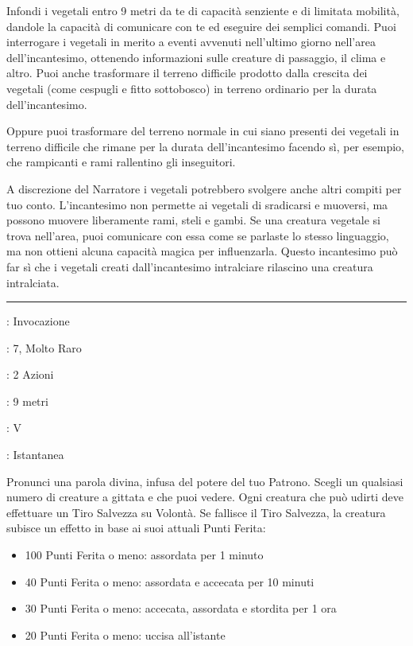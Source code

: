 \begin{multicols}{2}
Infondi i vegetali entro 9 metri da te di capacità senziente e di limitata mobilità, dandole la capacità di comunicare con te ed eseguire dei semplici comandi. Puoi interrogare i vegetali in merito a eventi avvenuti nell'ultimo giorno nell'area dell'incantesimo, ottenendo informazioni sulle creature di passaggio, il clima e altro. Puoi anche trasformare il terreno difficile prodotto dalla crescita dei vegetali (come cespugli e fitto sottobosco) in terreno ordinario per la durata dell'incantesimo.

Oppure puoi trasformare del terreno normale in cui siano presenti dei vegetali in terreno difficile che rimane per la durata dell'incantesimo facendo sì, per esempio, che rampicanti e rami rallentino gli inseguitori.

A discrezione del Narratore i vegetali potrebbero svolgere anche altri compiti per tuo conto. L'incantesimo non permette ai vegetali di sradicarsi e muoversi, ma possono muovere liberamente rami, steli e gambi. Se una creatura vegetale si trova nell'area, puoi comunicare con essa come se parlaste lo stesso linguaggio, ma non ottieni alcuna capacità magica per influenzarla. Questo incantesimo può far sì che i vegetali creati dall'incantesimo intralciare rilascino una creatura intralciata.

\smallskip\noindent\rule{\linewidth}{2pt} \hypertarget{Parola Divina}{}\smallskip{}
\noindent
\begin{description}[noitemsep, topsep=0pt, parsep=0pt, partopsep=0pt, leftmargin=0cm, labelwidth=2.8cm]
	\item[\textbf{Lista di Magia}]: Invocazione
	\item[\textbf{Livello}]: 7, Molto Raro
	\item[\textbf{T. di Lancio}]: 2 Azioni
	\item[\textbf{Gittata}]: 9 metri
	\item[\textbf{Componenti}]: V
	\item[\textbf{Durata}]: Istantanea
\end{description}

Pronunci una parola divina, infusa del potere del tuo Patrono. Scegli un qualsiasi numero di creature a gittata e che puoi vedere. Ogni creatura che può udirti deve effettuare un Tiro Salvezza su Volontà. Se fallisce il Tiro Salvezza, la creatura subisce un effetto in base ai suoi attuali Punti Ferita:

\begin{itemize}[leftmargin=*] \setlength{\itemsep}{0pt}
	\item 100 Punti Ferita o meno: assordata per 1 minuto
	\item 40 Punti Ferita o meno: assordata e accecata per 10 minuti
	\item 30 Punti Ferita o meno: accecata, assordata e stordita per 1 ora
	\item 20 Punti Ferita o meno: uccisa all'istante
\end{itemize}


\end{multicols}
